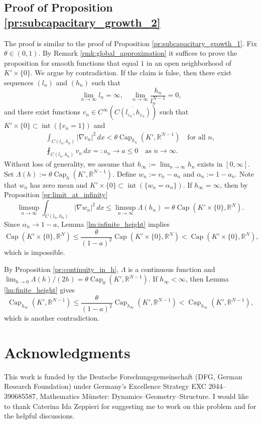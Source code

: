 \documentclass{article}
\numberwithin{equation}{section}
\theoremstyle{definition}
\theoremstyle{remark}
\newcommand{\cpct}{\operatorname{Cap}}
\newcommand{\topint}{\operatorname{int}}
\begin{document}
\subsection{Proof of Proposition \ref{pr:subcapacitary_growth_2}}

The proof is similar to the proof of Proposition \ref{pr:subcapacitary_growth_1}. Fix $\theta \in (0, 1)$. By Remark \ref{rmk:global_approximation} it suffices to prove the proposition for smooth functions that equal $1$ in an open neighborhood of $K' \times \{0\}$. We argue by contradiction. If the claim is false, then there exist sequences $(l_n)$ and $(h_n)$ such that
\[
\lim_{n \to \infty} l_n = \infty, \quad \lim_{n \to \infty} \frac{h_n}{l_n^{N - 1}} = 0,
\]
and there exist functions $v_n \in C^\infty(\overline{C(l_{\varepsilon_n}, h_{\varepsilon_n})})$ such that $K' \times \{0\} \subset \topint(\{v_n = 1\})$ and
\begin{gather*}
    \int_{C(l_n, h_n)} |\nabla v_n|^2 \, dx < \theta \cpct_{h_n}(K', \mathbb{R}^{N - 1}) \quad \text{for all } n, \\
    \fint_{C(l_n, h_n)} v_n \, dx =: a_n \to a \le 0 \quad \text{as } n \to \infty.
\end{gather*}
Without loss of generality, we assume that $h_\infty := \lim_{n \to \infty} h_n$ exists in $[0, \infty]$. Set $\Lambda(h) := \theta \cpct_h(K', \mathbb{R}^{N - 1})$. Define $w_n := v_n - a_n$ and $\alpha_n := 1 - a_n$. Note that $w_n$ has zero mean and $K' \times \{0\} \subset \topint(\{w_n = \alpha_n\})$. If $h_\infty = \infty$, then by Proposition \ref{pr:limit_at_infinity}
\[
\limsup_{n \to \infty} \int_{C(l_n, h_n)} |\nabla w_n|^2 \, dx \le \limsup_{n \to \infty} \Lambda(h_n) = \theta \cpct(K' \times \{0\}, \mathbb{R}^N).
\]
Since $\alpha_n \to 1 - a$, Lemma \ref{lm:infinite_height} implies
\[
\cpct(K' \times \{0\}, \mathbb{R}^N) \le \frac{\theta}{(1 - a)^2} \cpct(K' \times \{0\}, \mathbb{R}^N) < \cpct(K' \times \{0\}, \mathbb{R}^N),
\]
which is impossible.

By Proposition \ref{pr:continuity_in_h}, $\Lambda$ is a continuous function and $\lim_{h \to 0} \Lambda(h)/(2h) = \theta \cpct_0(K', \mathbb{R}^{N - 1})$. If $h_\infty < \infty$, then Lemma \ref{lm:finite_height} gives
\[
\cpct_{h_\infty}(K', \mathbb{R}^{N - 1}) \le \frac{\theta}{(1 - a)^2} \cpct_{h_\infty}(K', \mathbb{R}^{N - 1}) < \cpct_{h_\infty}(K', \mathbb{R}^{N - 1}),
\]
which is another contradiction.

\section*{Acknowledgments}

This work is funded by the Deutsche Forschungsgemeinschaft (DFG, German Research Foundation) under Germany's Excellence Strategy EXC 2044–390685587, Mathematics Münster: Dynamics–Geometry–Structure. I would like to thank Caterina Ida Zeppieri for suggesting me to work on this problem and for the helpful discussions.



\end{document}
